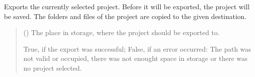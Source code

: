 \documentclass[letterpaper,10pt,english]{sphinxmanual}
\begin{document}
\begin{fulllineitems}
\begin{fulllineitems}
\begin{quote}
\begin{description}
\sphinxAtStartPar
{}

\end{description}\end{quote}

\end{fulllineitems}


\begin{fulllineitems}
\label{\detokenize{apidoc/src.osm_configurator.control:src.osm_configurator.control.control_interface.IControl.export_project}}
\pysigstartsignatures
{}
\pysigstopsignatures
\sphinxAtStartPar
Exports the currently selected project.
Before it will be exported, the project will be saved.
The folders and files of the project are copied to the given destination.
\begin{quote}\begin{description}
\sphinxAtStartPar
{} () \textendash{} The place in storage, where the project should be exported to.

\sphinxAtStartPar
True, if the export was successful; False, if an error occurred: The path was not valid or occupied, there was not enought space in storage or there was no project selected.

\sphinxAtStartPar
{}

\end{description}\end{quote}

\end{fulllineitems}



\end{fulllineitems}
\end{document}
